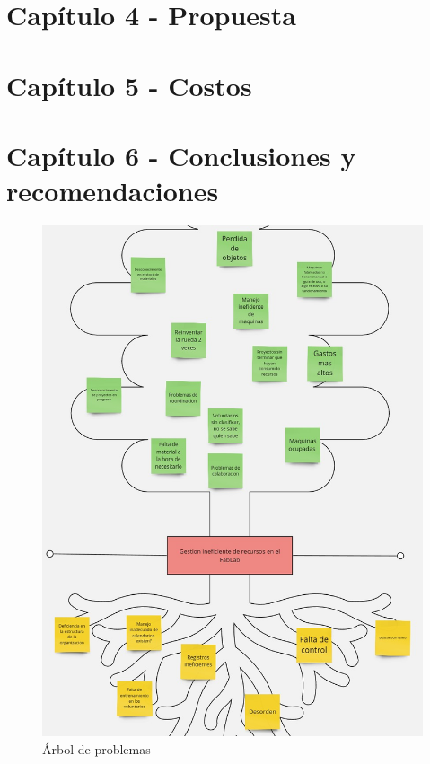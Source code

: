 \documentclass{article}
\begin{document}
\section{Capítulo 4 - Propuesta}
\section{Capítulo 5 - Costos}
\section{Capítulo 6 - Conclusiones y recomendaciones}
\begin{figure}[!htb]
  \caption{Árbol de problemas}
  \centering
  \includegraphics[width=\textwidth]{treeproblem.jpg}
\end{figure}
\end{document}

